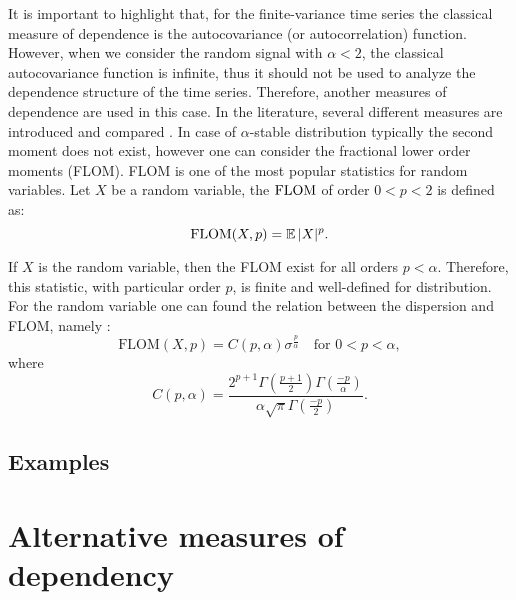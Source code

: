 It is important to highlight that, for the finite-variance time series the classical measure of dependence is the autocovariance (or autocorrelation) function. However, when we consider the \stab random signal  with $\alpha<2$, the classical autocovariance function is infinite, thus it should not be used to analyze the dependence structure of the time series. Therefore, another measures of dependence are used in this case. In the literature, several different measures are introduced and compared \cite{cambanis1980some,stable,rosinski1997equivalence,kodia2014estimation,damarackas2014properties}. In case of $\alpha$-stable distribution typically the second moment does not exist, however one can consider the fractional lower order moments (FLOM). FLOM is one of the most popular statistics for \stab random variables. Let $X$ be a random variable, the $\operatorname{FLOM}$ of order $0<p<2$ is  defined as:
\begin{equation*}
    \operatorname{FLOM}(X,p)=\operatorname{\mathbb{E}}|X|^p.
\end{equation*}

If $X$ is the \stab random variable, then the FLOM exist for all orders $p<\alpha$. Therefore, this statistic, with particular order $p$, is finite and well-defined for \stab distribution. For the \sas random variable one can found the relation between the dispersion and FLOM, namely
 \cite{stable}:
\begin{equation*}
    \textrm{FLOM}(X,p)=C(p,\alpha){\sigma^{\frac{p}{\alpha}}} \quad \textrm{for } 0<p<\alpha,
\end{equation*}
where 
\begin{equation*}
    C(p,\alpha)=\frac{2^{p+1}\Gamma(\frac{p+1}{2})\Gamma(\frac{-p}{\alpha})}{\alpha\sqrt{\pi}\Gamma(\frac{-p}{2})}.
\end{equation*}
%
\subsection{Examples}
%
\section{Alternative measures of dependency}
%

